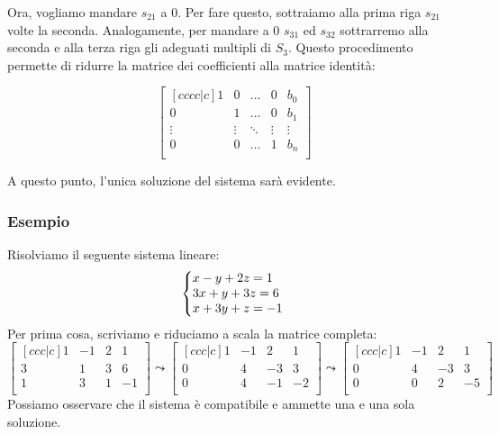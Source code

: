 \documentclass{article}
\begin{document}
Ora, vogliamo mandare $s_{21}$ a $0$. Per fare questo,
sottraiamo alla prima riga $s_{21}$ volte la seconda.
Analogamente, per mandare a $0$ $s_{31}$ ed $s_{32}$ sottrarremo
alla seconda e alla terza riga gli adeguati multipli di $S_3$.
Questo procedimento permette di ridurre la matrice dei coefficienti
alla matrice identità:

\[\begin{bmatrix}[cccc|c]
    1      & 0      & \dots  & 0      & b_0 \\
    0      & 1      & \dots  & 0      & b_1 \\
    \vdots & \vdots & \ddots & \vdots & \vdots \\
    0      & 0      & \dots  & 1      & b_n \\
\end{bmatrix}\]

A questo punto, l'unica soluzione del sistema sarà evidente.

\subsubsection*{Esempio}
Risolviamo il seguente sistema lineare:
\[\left\{\begin{array}{@{}l@{}}
    x - y + 2z = 1 \\
    3x + y + 3z = 6 \\
    x + 3y + z = -1 \\
\end{array}\right.\,\]
Per prima cosa, scriviamo e riduciamo a scala la matrice completa:
\[
    \begin{bmatrix}[ccc|c]
        1 & -1 & 2 & 1 \\
        3 & 1 & 3 & 6 \\
        1 & 3 & 1 & -1 \\
    \end{bmatrix} \leadsto \begin{bmatrix}[ccc|c]
        1 & -1 & 2 & 1 \\
        0 & 4 & -3 & 3 \\
        0 & 4 & -1 & -2 \\
    \end{bmatrix} \leadsto \begin{bmatrix}[ccc|c]
        1 & -1 & 2 & 1 \\
        0 & 4 & -3 & 3 \\
        0 & 0 & 2 & -5 \\
    \end{bmatrix}
\]
Possiamo osservare che il sistema è compatibile
e ammette una e una sola soluzione.
\end{document}
